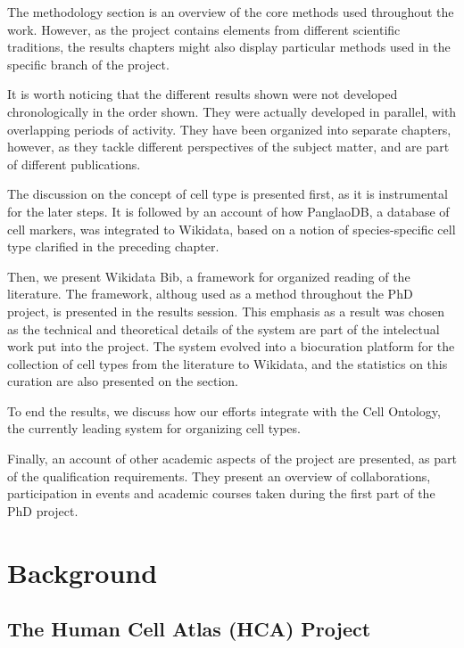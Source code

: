 The methodology section is an overview of the core methods used throughout the work.
However, as the project contains elements from different scientific traditions, the results chapters might also display particular methods used in the specific branch of the project.

It is worth noticing that the different results shown were not developed chronologically in the order shown.
They were actually developed in parallel, with overlapping periods of activity.
They have been organized into separate chapters, however, as they tackle different perspectives of the subject matter, and are part of different publications.

The discussion on the concept of cell type is presented first, as it is instrumental for the later steps.
It is followed by an account of how PanglaoDB, a database of cell markers, was integrated to Wikidata, based on a notion of species-specific cell type clarified in the preceding chapter.

Then, we present Wikidata Bib, a framework for organized reading of the literature.
The framework, althoug used as a method throughout the PhD project, is presented in the results session.
This emphasis as a result was chosen as the technical and theoretical details of the system are part of the intelectual work put into the project.
The system evolved into a biocuration platform for the collection of cell types from the literature to Wikidata, and the statistics on this curation are also presented on the section.

To end the results, we discuss how our efforts integrate with the Cell Ontology, the currently leading system for organizing cell types.

Finally, an account of other academic aspects of the project are presented, as part of the qualification requirements.
They present an overview of collaborations, participation in events and academic courses taken during the first part of the PhD project.

\hypertarget{background}{%
\section{Background}\label{background}}

\hypertarget{the-human-cell-atlas-hca-project}{%
\subsection{The Human Cell Atlas (HCA) Project}\label{the-human-cell-atlas-hca-project}}

